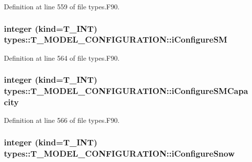 Definition at line 559 of file types.F90.

\hypertarget{typetypes_1_1_t___m_o_d_e_l___c_o_n_f_i_g_u_r_a_t_i_o_n_a650ebd6690319e59e9da1272d3f678fa}{
\subsubsection[{iConfigureSM}]{\setlength{\rightskip}{0pt plus 5cm}integer (kind={\bf T\_\-INT}) {\bf types::T\_\-MODEL\_\-CONFIGURATION::iConfigureSM}}}
\label{typetypes_1_1_t___m_o_d_e_l___c_o_n_f_i_g_u_r_a_t_i_o_n_a650ebd6690319e59e9da1272d3f678fa}


Definition at line 564 of file types.F90.

\hypertarget{typetypes_1_1_t___m_o_d_e_l___c_o_n_f_i_g_u_r_a_t_i_o_n_ae467dbeeac893d8db4f2a787a6af24d0}{
\subsubsection[{iConfigureSMCapacity}]{\setlength{\rightskip}{0pt plus 5cm}integer (kind={\bf T\_\-INT}) {\bf types::T\_\-MODEL\_\-CONFIGURATION::iConfigureSMCapacity}}}
\label{typetypes_1_1_t___m_o_d_e_l___c_o_n_f_i_g_u_r_a_t_i_o_n_ae467dbeeac893d8db4f2a787a6af24d0}


Definition at line 566 of file types.F90.

\hypertarget{typetypes_1_1_t___m_o_d_e_l___c_o_n_f_i_g_u_r_a_t_i_o_n_ae161338bd5d8890d5264205f231409ac}{
\subsubsection[{iConfigureSnow}]{\setlength{\rightskip}{0pt plus 5cm}integer (kind={\bf T\_\-INT}) {\bf types::T\_\-MODEL\_\-CONFIGURATION::iConfigureSnow}}}
\label{typetypes_1_1_t___m_o_d_e_l___c_o_n_f_i_g_u_r_a_t_i_o_n_ae161338bd5d8890d5264205f231409ac}


